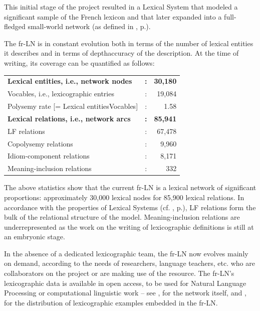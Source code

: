 This initial stage of the project resulted in a Lexical System that modeled a significant sample of the French lexicon and that later expanded into a full-fledged small-world network (as defined in , p.\thinspace\pageref{sec:formalPropertiesLS}).

The fr-LN is in constant evolution both in terms of the number of lexical entities it describes and in terms of depth\slashs{}accuracy of the description. At the time of writing, its coverage can be quantified as follows:

\begin{center}
\setlength{\tabcolsep}{2.2pt}
\begin{tabular}{ l c r }

\textsf{\textbf{Lexical entities, i.e., network nodes}} & \textsf{\textbf{:}} & \textsf{\textbf{30,180}} \\
Vocables, i.e., lexicographic entries & : & 19,084 \\
Polysemy rate [= Lexical entities\slashs{}Vocables] & : & 1.58 \\[+6pt]

\textsf{\textbf{Lexical relations, i.e., network arcs}} & \textsf{\textbf{:}} & \textsf{\textbf{85,941}} \\
LF relations & : & 67,478 \\
Copolysemy relations & : & 9,960 \\
Idiom-component relations & : & 8,171 \\
Meaning-inclusion relations & : & 332 \\

\end{tabular}
\end{center}

The above statistics show that the current fr-LN is a lexical network of significant proportions: approximately 30,000 lexical nodes for 85,900 lexical relations. In accordance with the properties of Lexical Systems (cf. , p.\thinspace\pageref{sec:LFRelationsBackboneOfLFs}), LF relations form the bulk of the relational structure of the model. Meaning-inclusion relations are underrepresented as the work on the writing of lexicographic definitions is still at an embryonic stage.

In the absence of a dedicated lexicographic team, the fr-LN now evolves mainly on demand, according to the needs of researchers, language teachers, etc. who are collaborators on the project or are making use of the resource. The fr-LN's lexicographic data is available in open access, to be used for Natural Language Processing or computational linguistic work -- see \textcite{ATILF2024a}, for the network itself, and \textcite{ATILF2024b}, for the distribution of lexicographic examples embedded in the fr-LN.

